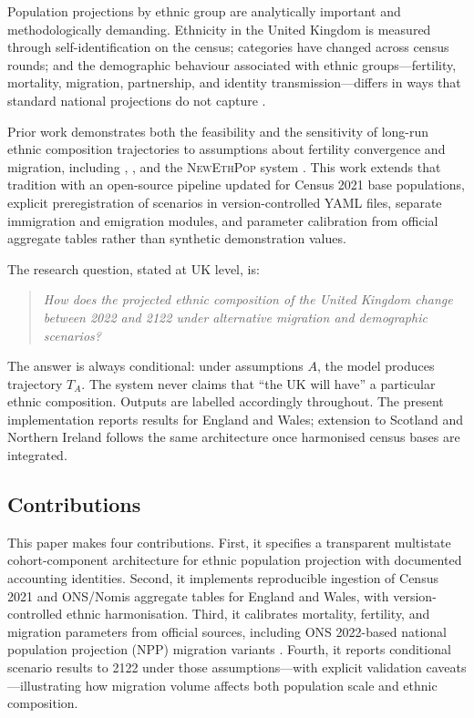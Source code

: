 \documentclass[12pt,a4paper]{article}
\begin{document}
Population projections by ethnic group are analytically important and methodologically
demanding. Ethnicity in the United Kingdom is measured through self-identification on the
census; categories have changed across census rounds; and the demographic behaviour associated
with ethnic groups---fertility, mortality, migration, partnership, and identity
transmission---differs in ways that standard national projections do not capture
\citep{haskey2002, rees2011, rees2017}.

Prior work demonstrates both the feasibility and the sensitivity of long-run ethnic
composition trajectories to assumptions about fertility convergence and migration, including
\citet{wohland2010}, \citet{coleman2010}, and the \textsc{NewEthPop} system
\citep{newethpop}. This work extends that tradition with an open-source pipeline updated
for Census 2021 base populations, explicit preregistration of scenarios in version-controlled
YAML files, separate immigration and emigration modules, and parameter calibration from
official aggregate tables rather than synthetic demonstration values.

The research question, stated at UK level, is:

\begin{quote}
\emph{How does the projected ethnic composition of the United Kingdom change between 2022
and 2122 under alternative migration and demographic scenarios?}
\end{quote}

The answer is always conditional: under assumptions $A$, the model produces trajectory $T_A$.
The system never claims that ``the UK will have'' a particular ethnic composition. Outputs
are labelled accordingly throughout. The present implementation reports results for England
and Wales; extension to Scotland and Northern Ireland follows the same architecture once
harmonised census bases are integrated.

\subsection{Contributions}

This paper makes four contributions. First, it specifies a transparent multistate
cohort-component architecture for ethnic population projection with documented accounting
identities. Second, it implements reproducible ingestion of Census 2021 and ONS/Nomis
aggregate tables for England and Wales, with version-controlled ethnic harmonisation.
Third, it calibrates mortality, fertility, and migration parameters from official sources,
including ONS 2022-based national population projection (NPP) migration variants
\citep{ons2024nppvariants}. Fourth, it reports conditional scenario results to 2122 under
those assumptions---with explicit validation caveats---illustrating how migration volume
affects both population scale and ethnic composition.
\end{document}
